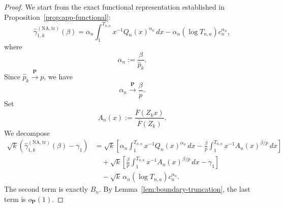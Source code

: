 \documentclass[reqno,openbib,runningheads,a4paper,12pt]{amsart}%
\begin{document}
\begin{proof}
We start from the exact functional representation established in
Proposition~\ref{prop:app-functional}:
\[
\widehat{\gamma}_{1,k}^{(\mathrm{NA,tr})}(\beta)=\alpha_{n}\int_{1}^{T_{n,a}%
}x^{-1}Q_{n}(x)^{\alpha_{n}}\,dx-\alpha_{n}(\log T_{n,a})c_{n}^{\alpha_{n}},
\]
where
\[
\alpha_{n}:=\frac{\beta}{\widehat{p}_{k}}.
\]
Since $\widehat{p}_{k}\overset{\mathbf{P}}{\longrightarrow}p$, we have
\[
\alpha_{n}\overset{\mathbf{P}}{\longrightarrow}\frac{\beta}{p}.
\]
Set
\[
A_{n}(x):=\frac{\overline{F}(Z_{k}x)}{\overline{F}(Z_{k})}.
\]
We decompose
\[
\begin{aligned}
		\sqrt{k}\left(
		\widehat{\gamma}_{1,k}^{(\mathrm{NA,tr})}(\beta)-\gamma_{1}
		\right)
		&=
		\sqrt{k}
		\left[
		\alpha_n\int_{1}^{T_{n,a}}x^{-1}Q_n(x)^{\alpha_n}\,dx
		-
		\frac{\beta}{p}\int_{1}^{T_{n,a}}x^{-1}A_n(x)^{\beta/p}\,dx
		\right]  \\
		&\quad+
		\sqrt{k}
		\left[
		\frac{\beta}{p}\int_{1}^{T_{n,a}}x^{-1}A_n(x)^{\beta/p}\,dx
		-\gamma_1
		\right]  \\
		&\quad-
		\sqrt{k}\,\alpha_n(\log T_{n,a})c_n^{\alpha_n}.
	\end{aligned}
\]
The second term is exactly $B_{n}$. By Lemma~\ref{lem:boundary-truncation},
the last term is $o_{\mathbf{P}}(1)$.


\end{proof}
\end{document}
